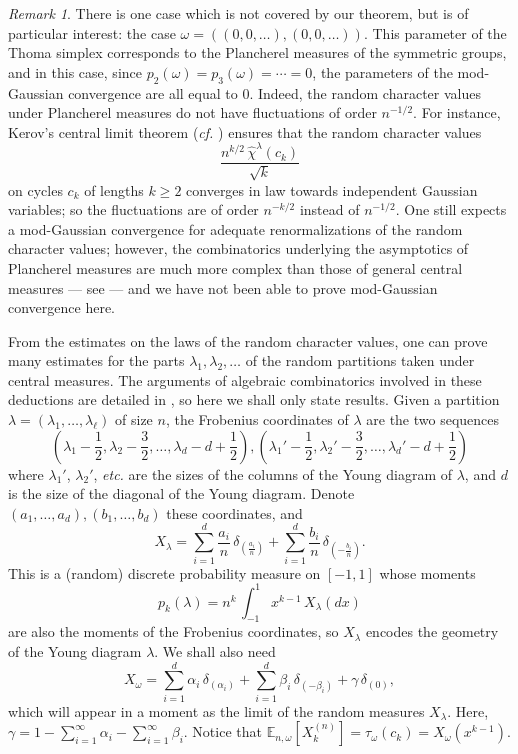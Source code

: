 \documentclass[12pt,a4paper,reqno]{amsart}
\theoremstyle{remark}
\newtheorem{remark}[lemma]{Remark}
\newcommand{\esper}{\mathbb{E}}
\newcommand{\SubGraph}{X^{(n)}}
\begin{document}
\begin{remark} There is one case which is not covered by our theorem,
but is of particular interest: the case $\omega=((0,0,\ldots),(0,0,\ldots))$.
This parameter of the Thoma simplex corresponds to the Plancherel measures of the symmetric groups, and in this case, since $p_{2}(\omega)=p_{3}(\omega)=\cdots=0$, the parameters of the mod-Gaussian convergence are all equal to $0$. Indeed, the random character values under Plancherel measures do not have fluctuations of order $n^{-1/2}$. For instance, Kerov's central limit theorem (\emph{cf.} \cite{Hora98,IO02}) ensures that the random character values
$$\frac{n^{k/2}\,\widehat{\chi}^{\lambda}(c_{k})}{\sqrt{k}}$$
on cycles $c_{k}$ of lengths $k \geq 2$ converges in law towards independent Gaussian variables; so the fluctuations are of order $n^{-k/2}$ instead of $n^{-1/2}$. One still expects a mod-Gaussian convergence for adequate renormalizations of the random character values; however, the combinatorics underlying the asymptotics of Plancherel measures are much more complex than those of general central measures --- see \cite{Sni06a} --- and we have not been able to prove mod-Gaussian convergence here.\bigskip
\end{remark}

From the estimates on the laws of the random character values, one can prove many estimates for the parts $\lambda_{1},\lambda_{2},\ldots$ of the random partitions taken under central measures. The arguments of algebraic combinatorics involved in these deductions are detailed in \cite{FM12,Mel12}, so here we shall only state results. Given a partition $\lambda=(\lambda_{1},\ldots,\lambda_{\ell})$ of size $n$, the Frobenius coordinates of $\lambda$ are the two sequences
$$\left(\lambda_{1}-\frac{1}{2},\lambda_{2}-\frac{3}{2},\ldots,\lambda_{d}-d+\frac{1}{2}\right),\left(\lambda_{1}'-\frac{1}{2},\lambda_{2}'-\frac{3}{2},\ldots,\lambda_{d}'-d+\frac{1}{2}\right)$$
where $\lambda_{1}'$, $\lambda_{2}'$, \emph{etc.} are the sizes of the columns of the Young diagram of $\lambda$, and $d$ is the size of the diagonal of the Young diagram. Denote $(a_{1},\ldots,a_{d}),(b_{1},\ldots,b_{d})$ these coordinates, and
$$X_{\lambda}=\sum_{i=1}^{d} \frac{a_{i}}{n}\,\delta_{\left(\frac{a_{i}}{n}\right)}+\sum_{i=1}^{d}\frac{b_{i}}{n}\,\delta_{\left(-\frac{b_{i}}{n}\right)}.$$
This is a (random) discrete probability measure on $[-1,1]$ whose moments
$$p_{k}(\lambda)=n^{k}\,\int_{-1}^{1} x^{k-1}\, X_{\lambda}(dx)$$
are also the moments of the Frobenius coordinates, so $X_{\lambda}$ encodes the geometry of the Young diagram $\lambda$. We shall also need
$$X_{\omega}=\sum_{i=1}^{d} \alpha_{i}\,\delta_{\left(\alpha_{i}\right)}+\sum_{i=1}^{d}\beta_{i}\,\delta_{\left(-\beta_{i}\right)}+\gamma\,\delta_{\left(0\right)},$$
which will appear in a moment as the limit of the random measures $X_{\lambda}$. Here, $\gamma=1-\sum_{i=1}^{\infty}\alpha_{i}-\sum_{i=1}^{\infty}\beta_{i}$. Notice that $\esper_{n,\omega}[\SubGraph_{k}]=\tau_{\omega}(c_{k})=X_{\omega}(x^{k-1})$.\bigskip
\end{document}
